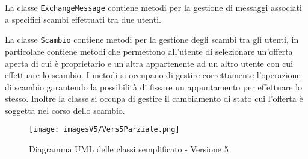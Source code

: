 La classe \texttt{ExchangeMessage} contiene metodi per la gestione di messaggi associati a specifici scambi effettuati tra due utenti.

La classe \texttt{Scambio} contiene metodi per la gestione degli scambi tra gli utenti, in particolare contiene metodi che permettono all'utente di selezionare un'offerta aperta di cui è proprietario e un'altra appartenente ad un altro utente con cui effettuare lo scambio. I metodi si occupano di gestire correttamente l'operazione di scambio garantendo la possibilità di fissare un appuntamento per effettuare lo stesso. Inoltre la classe si occupa di gestire il cambiamento di stato cui l'offerta è soggetta nel corso dello scambio.

\begin{figure}[bh]
    \centering
    \texttt{[image: imagesV5/Vers5Parziale.png]}
    \caption{\label{fig:Simplified Class Diagram - v5}Diagramma UML delle classi semplificato - Versione 5}
\end{figure}
\bigskip